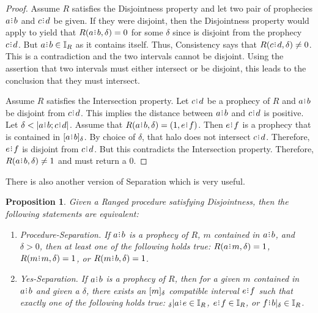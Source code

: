 \documentclass[12pt]{article}
\newtheorem{proposition}{Proposition}[section]
\begin{document}
\begin{proof}
    Assume $R$ satisfies the Disjointness property and let two pair of prophecies $a \rint b$ and $c \rint d$ be given.  If they were disjoint, then the Disjointness property would apply to yield that $R(a\rint b, \delta)= 0$ for some $\delta$ since is disjoint from the prophecy $c \rint d$. But $a\rint b \in \mathbb{I}_R$ as it contains itself. Thus, Consistency says that $R(c\rint d, \delta) \neq 0 $. This is a contradiction and the two intervals cannot be disjoint. Using the assertion that two intervals must either intersect or be disjoint, this leads to the conclusion that they must intersect. 

    Assume $R$ satisfies the Intersection property. Let $c \rint d$ be a prophecy of $R$ and $a \rint b$ be disjoint from $c \rint d$. This implies the distance between $a \rint b$ and $c \rint d$ is positive. Let $\delta < |a \rint b; c \rint d|$. Assume that $R(a \rint b,\delta) = (1, e \rint f)$. Then $e \rint f$ is a prophecy that is contained in $\halo{a \rint b}$. By choice of $\delta$, that halo does not intersect $c \rint d$. Therefore, $e \rint f$ is disjoint from $c \rint d$. But this contradicts the Intersection property. Therefore, $R(a \rint b, \delta) \neq 1$ and must return a $0$. 
\end{proof}

There is also another version of Separation which is very useful. 

\begin{proposition}
    Given a Ranged procedure satisfying Disjointness, then the following statements are equivalent: 
    \begin{enumerate}
        \item Procedure-Separation. If $a\rint b$ is a prophecy of $R$, $m$ contained in $a\rint b$, and $\delta > 0$, then at least one of the following holds true: $R(a \rint m, \delta) =1$, $R(m \rint m, \delta) = 1$, or $R(m \rint b, \delta) = 1$.
        \item Yes-Separation. If $a\rint b$ is a prophecy of $R$, then for a given $m$ contained in $a\rint b$ and given a $\delta$, there exists an $[m]_{\delta}$ compatible interval $e\rint f$ such that exactly one of the following holds true:   ${}_\delta |a\rint e \in \mathbb{I}_R$, $e\rint f \in \mathbb{I}_R$,  or $f\rint b|_\delta \in \mathbb{I}_R$.
    \end{enumerate}
\end{proposition}
\end{document}
